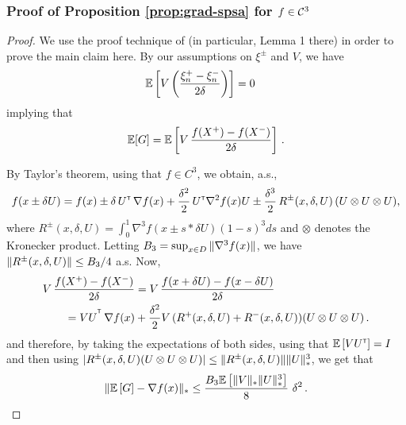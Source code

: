 \subsubsection*{Proof of Proposition \ref{prop:grad-spsa} for $f \in \mathcal{C}^3$}
\begin{proof}
We use the proof technique of \cite{spall1992multivariate} (in particular, Lemma 1 there) in order to prove the main claim here.
By our assumptions on $\xi^{\pm}$ and $V$,  we have
\begin{align*}
&\mathbb{E}\left[  V\left(\dfrac{\xi_n^+ - \xi_n^-}{2\delta}\right) \right]= 0 
\end{align*}
implying that
\begin{align*}
\mathbb{E}[G] =  \mathbb{E}\left[V\,  \dfrac{f(X^+)  -f(X^-)}{2\delta} \right]\,.
\end{align*}

By Taylor's theorem, using that $f\in C^3$, we obtain, a.s., 
\begin{align*}
f(x \pm \delta U) =
 f(x) 
 \pm\delta\,  U^\mathsf{\scriptscriptstyle T}\,\nabla f(x)   
  + \frac{\delta^2}{2}\, U^\mathsf{\scriptscriptstyle T} \nabla^2 f(x) U 
  \pm  \frac{\delta^3}{2} \, R^{\pm}(x,\delta,U) \,(U \otimes U \otimes U),
\end{align*}
where
$R^{\pm}(x,\delta,U)= \int_0^1  \nabla^3 f(  x \pm s * \delta U ) (1-s)^3 ds $ and
 $\otimes$ denotes the Kronecker product.
Letting $B_3 = \sup_{x\in D} \| \nabla^3 f(x) \|$, 
we have $\| R^{\pm}(x,\delta,U)\| \le B_3/4$ a.s.
Now,
\begin{align}
\begin{split}
\MoveEqLeft       V\, \dfrac{f(X^+)-f(X^-)}{2\delta}
  = V\, \dfrac{f(x+\delta U) - f(x-\delta U)}{2\delta} \\
&= VU^{\tr}
\, \nabla f(x)   +   \frac{\delta^2}{2}  V \,(R^{+}(x,\delta,U)+R^{-}(x,\delta,U))(U \otimes U \otimes U)\,. 
\end{split}
\label{eq:l1}
\end{align}
and therefore, 
by taking the expectations of both sides, 
using that $\mathbb{E}\left[V U^\mathsf{\scriptscriptstyle T}\right] = I$ and then using $|R^{\pm}(x,\delta,U) (U \otimes U \otimes U)| \le 
\|R^{\pm}(x,\delta,U)\| \|U\|_*^3$, 
we get that
\begin{align*}
\| \mathbb{E}\left[ G \right] - \nabla f(x) \|_* 
\le \frac{B_3 \mathbb{E}\left[ \|V\|_* \|U\|_*^3 \right]}{8}\,\, \delta^2 \,.
\end{align*}


\end{proof}
